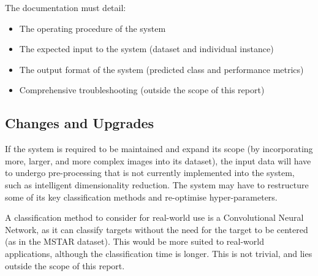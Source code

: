 The documentation must detail:
\begin{itemize}
	\item The operating procedure of the system
	\item The expected input to the system (dataset and individual instance)
	\item The output format of the system (predicted class and performance metrics)
	\item Comprehensive troubleshooting (outside the scope of this report)
\end{itemize}

\subsection{Changes and Upgrades}

If the system is required to be maintained and expand its scope (by incorporating more, larger, and more complex images into its dataset), the input data will have to undergo pre-processing that is not currently implemented into the system, such as intelligent dimensionality reduction. The system may have to restructure some of its key classification methods and re-optimise hyper-parameters. 

A classification method to consider for real-world use is a Convolutional Neural Network, as it can classify targets without the need for the target to be centered (as in the MSTAR dataset). This would be more suited to real-world applications, although the classification time is longer. This is not trivial, and lies outside the scope of this report.













